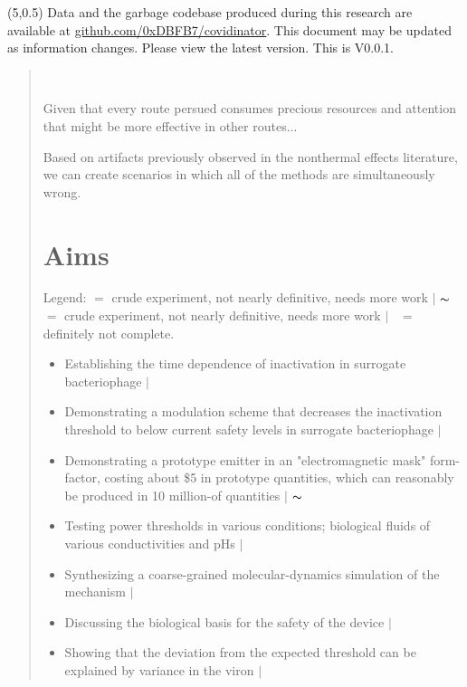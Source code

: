 \documentclass[paper.tex]{subfiles}
\begin{document}
\null\begin{tabular}[t]{l@{}}
	  \\
	
\end{tabular}


\begin{textblock}{10}(5,0.5)
\noindent Data and the garbage codebase produced during this research are available at \href{https://www.github.com/0xDBFB7/covidinator}{github.com/0xDBFB7/covidinator}. This document may be updated as information changes. Please view the latest version. This is V0.0.1.
\end{textblock}

\begin{quotation}\



Given that every route persued consumes precious resources and attention that might be more effective in 
other routes...



Based on artifacts previously observed in the nonthermal effects literature, we can create scenarios in which all of the methods are simultaneously wrong. 

\section{Aims}




Legend:  \cmark $ = $ crude experiment, not nearly definitive, needs more work $\vert$ $\thicksim$ $ = $ crude experiment, not nearly definitive, needs more work $\vert$ \xmark \ $ = $ definitely not complete.\\

\begin{itemize}
  \item Establishing the time dependence of inactivation in surrogate bacteriophage $\vert$ \cmark
  \item Demonstrating a modulation scheme that decreases the inactivation threshold to below current safety levels in surrogate bacteriophage $\vert$ \cmark
  \item Demonstrating a prototype emitter in an "electromagnetic mask" form-factor, costing about \$5 in prototype quantities, which can reasonably be produced in 10 million-of quantities $\vert$ $\thicksim$
  \item Testing power thresholds in various conditions; biological fluids of various conductivities and pHs $\vert$ \xmark
  \item Synthesizing a coarse-grained molecular-dynamics simulation of the mechanism $\vert$ \xmark
  \item Discussing the biological basis for the safety of the device $\vert$ \cmark
  \item Showing that the deviation from the expected threshold can be explained by variance in the viron $\vert$ \cmark
  

\end{itemize}
\end{quotation}
\end{document}
